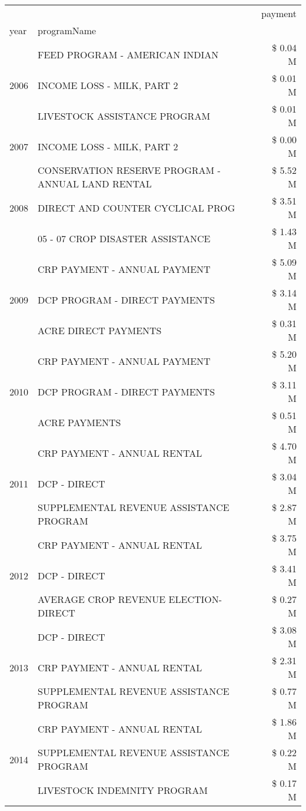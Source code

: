 \begin{tabular}{llr}
\toprule
 &  & payment \\
year & programName &  \\
\midrule
\multirow[t]{3}{*}{2006} & FEED PROGRAM - AMERICAN INDIAN & \$ 0.04 M \\
 & INCOME LOSS - MILK, PART 2 & \$ 0.01 M \\
 & LIVESTOCK ASSISTANCE PROGRAM & \$ 0.01 M \\
\cline{1-3}
2007 & INCOME LOSS - MILK, PART 2 & \$ 0.00 M \\
\cline{1-3}
\multirow[t]{3}{*}{2008} & CONSERVATION RESERVE PROGRAM - ANNUAL LAND RENTAL & \$ 5.52 M \\
 & DIRECT AND COUNTER CYCLICAL PROG & \$ 3.51 M \\
 & 05 - 07 CROP DISASTER ASSISTANCE & \$ 1.43 M \\
\cline{1-3}
\multirow[t]{3}{*}{2009} & CRP PAYMENT - ANNUAL PAYMENT & \$ 5.09 M \\
 & DCP PROGRAM - DIRECT PAYMENTS & \$ 3.14 M \\
 & ACRE DIRECT PAYMENTS & \$ 0.31 M \\
\cline{1-3}
\multirow[t]{3}{*}{2010} & CRP PAYMENT - ANNUAL PAYMENT & \$ 5.20 M \\
 & DCP PROGRAM - DIRECT PAYMENTS & \$ 3.11 M \\
 & ACRE PAYMENTS & \$ 0.51 M \\
\cline{1-3}
\multirow[t]{3}{*}{2011} & CRP PAYMENT - ANNUAL RENTAL & \$ 4.70 M \\
 & DCP - DIRECT & \$ 3.04 M \\
 & SUPPLEMENTAL REVENUE ASSISTANCE PROGRAM & \$ 2.87 M \\
\cline{1-3}
\multirow[t]{3}{*}{2012} & CRP PAYMENT - ANNUAL RENTAL & \$ 3.75 M \\
 & DCP - DIRECT & \$ 3.41 M \\
 & AVERAGE CROP REVENUE ELECTION-DIRECT & \$ 0.27 M \\
\cline{1-3}
\multirow[t]{3}{*}{2013} & DCP - DIRECT & \$ 3.08 M \\
 & CRP PAYMENT - ANNUAL RENTAL & \$ 2.31 M \\
 & SUPPLEMENTAL REVENUE ASSISTANCE PROGRAM & \$ 0.77 M \\
\cline{1-3}
\multirow[t]{3}{*}{2014} & CRP PAYMENT - ANNUAL RENTAL & \$ 1.86 M \\
 & SUPPLEMENTAL REVENUE ASSISTANCE PROGRAM & \$ 0.22 M \\
 & LIVESTOCK INDEMNITY PROGRAM & \$ 0.17 M \\

\end{tabular}
